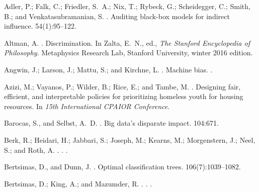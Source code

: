 \documentclass[letterpaper]{article} %
\theoremstyle{definition}
\newcommand{\1}{\ensuremath{{\rm e}}} %
\begin{document}

%
\begin{thebibliography}{}
	
	Adler, P.; Falk, C.; Friedler, S.~A.; Nix, T.; Rybeck, G.; Scheidegger, C.;
	Smith, B.; and Venkatasubramanian, S.
	.
	\newblock Auditing black-box models for indirect influence.
	 54(1):95--122.
	
	Altman, A.
	.
	\newblock Discrimination.
	\newblock In Zalta, E.~N., ed., {\em The Stanford Encyclopedia of Philosophy}.
	Metaphysics Research Lab, Stanford University, winter 2016 edition.
	
	Angwin, J.; Larson, J.; Mattu, S.; and Kirchne, L.
	.
	\newblock Machine bias.
	.
	
	Azizi, M.; Vayanos, P.; Wilder, B.; Rice, E.; and Tambe, M.
	.
	\newblock Designing fair, efficient, and interpretable policies for
	prioritizing homeless youth for housing resources.
	\newblock In {\em 15th International CPAIOR Conference}.
	
	Barocas, S., and Selbst, A.~D.
	.
	\newblock Big data’s disparate impact.
	 104:671.
	
	{Berk}, R.; {Heidari}, H.; {Jabbari}, S.; {Joseph}, M.; {Kearns}, M.;
	{Morgenstern}, J.; {Neel}, S.; and {Roth}, A.
	.
	.
	.
	
	Bertsimas, D., and Dunn, J.
	.
	\newblock Optimal classification trees.
	 106(7):1039--1082.
	
	{Bertsimas}, D.; {King}, A.; and {Mazumder}, R.
	.
	.
	.
	

\end{thebibliography}
\end{document}
